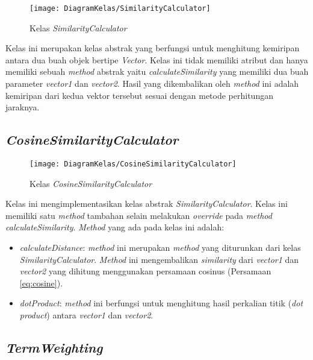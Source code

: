 \begin{figure}[H]
	\begin{center}
		\texttt{[image: DiagramKelas/SimilarityCalculator]}
		\caption{Kelas \textit{SimilarityCalculator}}
		\label{fig:kelasSimilarityCalculator}
	\end{center}
\end{figure}

Kelas ini merupakan kelas abstrak yang berfungsi untuk menghitung kemiripan antara dua buah objek bertipe \textit{Vector}. Kelas ini tidak memiliki atribut dan hanya memiliki sebuah \textit{method} abstrak yaitu \textit{calculateSimilarity} yang memiliki dua buah parameter \textit{vector1} dan \textit{vector2}. Hasil yang dikembalikan oleh \textit{method} ini adalah kemiripan dari kedua vektor tersebut sesuai dengan metode perhitungan jaraknya.

\subsection{\textit{CosineSimilarityCalculator}}

\begin{figure}[H]
	\begin{center}
		\texttt{[image: DiagramKelas/CosineSimilarityCalculator]}
		\caption{Kelas \textit{CosineSimilarityCalculator}}
		\label{fig:kelasCosineDist}
	\end{center}
\end{figure}

Kelas ini mengimplementasikan kelas abstrak \textit{SimilarityCalculator}. Kelas ini memiliki satu \textit{method} tambahan selain melakukan \textit{override} pada \textit{method calculateSimilarity}. \textit{Method} yang ada pada kelas ini adalah:

\begin{itemize}
	\item \textit{calculateDistance}: \textit{method} ini merupakan \textit{method} yang diturunkan dari kelas \textit{SimilarityCalculator}. \textit{Method} ini mengembalikan \textit{similarity} dari \textit{vector1} dan \textit{vector2} yang dihitung menggunakan persamaan cosinus (Persamaan \ref{eq:cosine}).
	\item \textit{dotProduct}: \textit{method} ini berfungsi untuk menghitung hasil perkalian titik (\textit{dot product}) antara \textit{vector1} dan \textit{vector2}.
\end{itemize}

\subsection{\textit{TermWeighting}}

